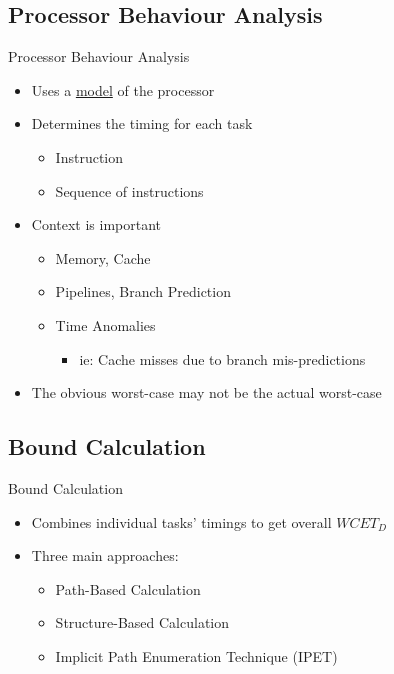 \documentclass{beamer}
\begin{document}
\subsection{Processor Behaviour Analysis}
\begin{frame}{Processor Behaviour Analysis}
  \begin{itemize}
    \item Uses a \underline{model} of the processor
    \item Determines the timing for each task
      \begin{itemize}
        \item Instruction
        \item Sequence of instructions
      \end{itemize}
    \item \alert{Context is important}
      \begin{itemize}
        \item Memory, Cache
        \item Pipelines, Branch Prediction
        \item<3-> Time Anomalies
          \begin{itemize}
            \item<3-> ie: Cache misses due to branch mis-predictions
          \end{itemize}
      \end{itemize}
      \item<2-> The obvious worst-case may not be the actual worst-case
  \end{itemize}
\end{frame}

\subsection{Bound Calculation}
\begin{frame}{Bound Calculation}  
  \begin{itemize}
    \item Combines individual tasks' timings to get overall $WCET_D$
      \pause
    \item Three main approaches:
      \begin{itemize}
        \item Path-Based Calculation
        \item Structure-Based Calculation
        \item Implicit Path Enumeration Technique (IPET)
      \end{itemize}
  \end{itemize}
\end{frame}
\end{document}
